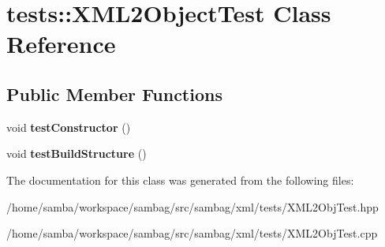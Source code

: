 \hypertarget{classtests_1_1_x_m_l2_object_test}{
\section{tests::XML2ObjectTest Class Reference}
\label{classtests_1_1_x_m_l2_object_test}
}
\subsection*{Public Member Functions}
\begin{DoxyCompactItemize}
\item 
\hypertarget{classtests_1_1_x_m_l2_object_test_a12a2155ad9dbec14c1e042c891ba7b31}{
void {\bfseries testConstructor} ()}
\label{classtests_1_1_x_m_l2_object_test_a12a2155ad9dbec14c1e042c891ba7b31}

\item 
\hypertarget{classtests_1_1_x_m_l2_object_test_a93e51a8b879a976b36a472c4349d7b9c}{
void {\bfseries testBuildStructure} ()}
\label{classtests_1_1_x_m_l2_object_test_a93e51a8b879a976b36a472c4349d7b9c}

\end{DoxyCompactItemize}


The documentation for this class was generated from the following files:\begin{DoxyCompactItemize}
\item 
/home/samba/workspace/sambag/src/sambag/xml/tests/XML2ObjTest.hpp\item 
/home/samba/workspace/sambag/src/sambag/xml/tests/XML2ObjTest.cpp\end{DoxyCompactItemize}
